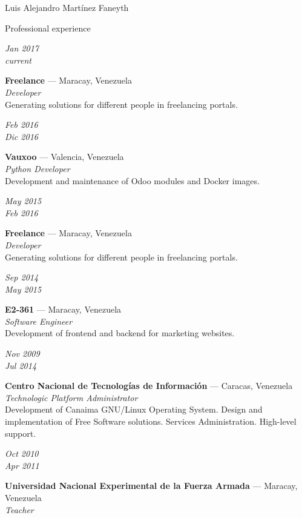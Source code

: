 \documentclass[11pt,letterpaper]{article}
\begin{document}
\begin{cv}{Luis Alejandro Mart\'inez Faneyth}
\begin{cvlist}{Professional experience}
\item[{\parbox[t]{6em}{\textit{\large{Jan 2017\\current}}}}]{
	\parbox[t]{\linewidth}{
		\textbf{Freelance} --- Maracay, Venezuela\\
		\textit{Developer}\\
		\footnotesize{Generating solutions for different people in freelancing portals.}
	}
}
\item[{\parbox[t]{6em}{\textit{\large{Feb 2016\\Dic 2016}}}}]{
	\parbox[t]{\linewidth}{
		\textbf{Vauxoo} --- Valencia, Venezuela\\
		\textit{Python Developer}\\
		\footnotesize{Development and maintenance of Odoo modules and Docker images.}
	}
}
\item[{\parbox[t]{6em}{\textit{\large{May 2015\\Feb 2016}}}}]{
	\parbox[t]{\linewidth}{
		\textbf{Freelance} --- Maracay, Venezuela\\
		\textit{Developer}\\
		\footnotesize{Generating solutions for different people in freelancing portals.}
	}
}
\item[{\parbox[t]{6em}{\textit{\large{Sep 2014\\May 2015}}}}]{
	\parbox[t]{\linewidth}{
		\textbf{E2-361} --- Maracay, Venezuela\\
		\textit{Software Engineer}\\
		\footnotesize{Development of frontend and backend for marketing websites.}
	}
}
\item[{\parbox[t]{6em}{\textit{\large{Nov 2009\\Jul 2014}}}}]{
	\parbox[t]{\linewidth}{
		\textbf{Centro Nacional de Tecnolog\'ias de Informaci\'on} --- Caracas, Venezuela\\
		\textit{Technologic Platform Administrator}\\
		\footnotesize{Development of Canaima GNU/Linux Operating System. Design and implementation of Free Software solutions. Services Administration. High-level support.}
	}
}
\item[{\parbox[t]{6em}{\textit{\large{Oct 2010\\Apr 2011}}}}]{
	\parbox[t]{\linewidth}{
		\textbf{Universidad Nacional Experimental de la Fuerza Armada} --- Maracay, Venezuela\\
		\textit{Teacher}\\
}}
\end{cvlist}
\end{cv}
\end{document}
